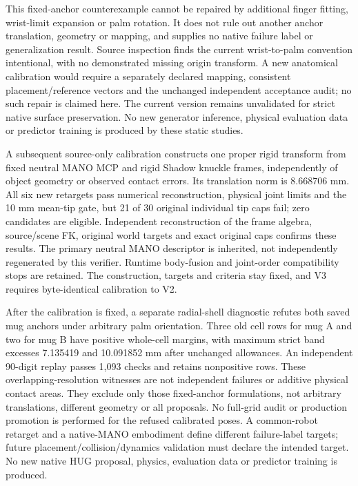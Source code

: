 \documentclass[10pt,letterpaper]{article}
\begin{document}
This fixed-anchor counterexample cannot be repaired by additional finger
fitting, wrist-limit expansion or palm rotation. It does not rule out another
anchor translation, geometry or mapping, and supplies no native failure label
or generalization result. Source inspection finds the current wrist-to-palm
convention intentional, with no demonstrated missing origin transform. A new
anatomical calibration would require a separately declared mapping, consistent
placement/reference vectors and the unchanged independent acceptance audit;
no such repair is claimed here. The current version remains unvalidated for
strict native surface preservation. No new generator inference, physical
evaluation data or predictor training is produced by these static studies.

A subsequent source-only calibration constructs one proper rigid transform
from fixed neutral MANO MCP and rigid Shadow knuckle frames, independently
of object geometry or observed contact errors. Its translation norm is
8.668706 mm. All six new retargets pass numerical reconstruction, physical
joint limits and the 10 mm mean-tip gate, but 21 of 30 original individual
tip caps fail; zero candidates are eligible. Independent reconstruction of
the frame algebra, source/scene FK, original world targets and exact original
caps confirms these results. The primary neutral MANO descriptor is inherited,
not independently regenerated by this verifier. Runtime body-fusion and
joint-order compatibility stops are retained. The construction, targets and
criteria stay fixed, and V3 requires byte-identical calibration to V2.

After the calibration is fixed, a separate radial-shell diagnostic refutes
both saved mug anchors under arbitrary palm orientation. Three old cell rows
for mug A and two for mug B have positive whole-cell margins, with maximum
strict band excesses 7.135419 and 10.091852 mm after unchanged allowances.
An independent 90-digit replay passes 1,093 checks and retains nonpositive
rows. These overlapping-resolution witnesses are not independent failures
or additive physical contact areas. They exclude only those fixed-anchor
formulations, not arbitrary translations, different geometry or all proposals.
No full-grid audit or production promotion is performed for the refused
calibrated poses. A common-robot retarget and a native-MANO embodiment define
different failure-label targets; future placement/collision/dynamics validation
must declare the intended target. No new native HUG proposal, physics,
evaluation data or predictor training is produced.
\end{document}

